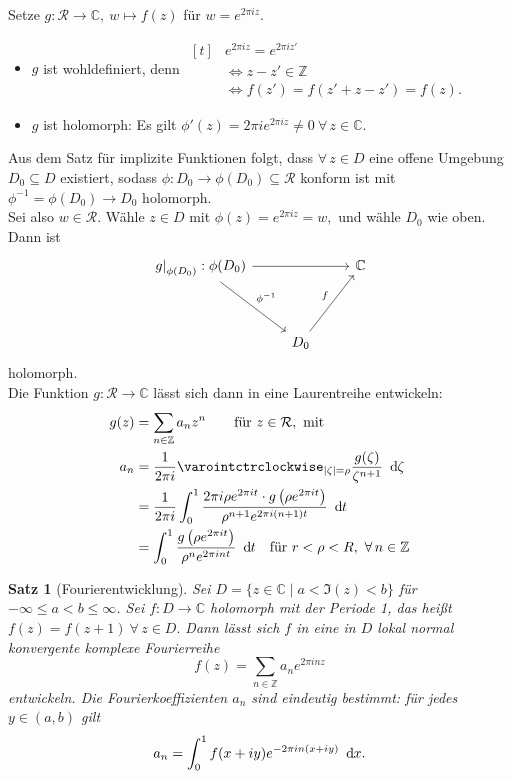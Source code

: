 \documentclass[a4paper,12pt]{book}
\theoremstyle{newthm}
\newtheorem{thm}{Satz}[section]
\theoremstyle{newdef}
\theoremstyle{newrem}
\newcommand{\Z}{\mathbb{Z}}
\newcommand{\C}{\mathbb{C}}
\renewcommand{\d}{\ \operatorname{d}\hspace{-2px}}
\newcommand{\bound}[2]{\left.#1\right|_{#2}}
\begin{document}
		Setze $ g: \mathcal{R} \to \C,\ w \mapsto f(z) $ für $ w = e^{2\pi iz} $.
		\begin{itemize}
			\item $g$ ist wohldefiniert, denn $ \begin{aligned}[t]
			&e^{2\pi iz} = e^{2\pi iz'} \\
			&\iff z - z' \in \Z \\
			&\iff f(z') = f(z' + z-z') = f(z).
			\end{aligned} $
			\item $g$ ist holomorph: Es gilt $ \phi'(z) = 2\pi i e^{2\pi iz} \neq 0\ \forall\, z \in \C. $
		\end{itemize}
		Aus dem Satz für implizite Funktionen folgt, dass $ \forall\, z \in D $ eine offene Umgebung $ D_0 \subseteq D $ existiert, sodass $ \phi: D_0 \to \phi(D_0) \subseteq \mathcal{R} $ konform ist mit $ \phi^{-1} = \phi(D_0) \to D_0 $ holomorph.\\
		Sei also $ w \in \mathcal{R}. $ Wähle $ z \in D $ mit $ \phi(z) = e^{2\pi iz} = w, $ und wähle $D_0$ wie oben. Dann ist
		$$\begin{tikzcd}
			\bound{g}{\phi(D_0)}:\phi(D_0)\arrow{rr}\arrow{ddr}{\phi^{-1}} & & \C\\
			&&\\
			&D_0 \arrow{uur}{f}
		\end{tikzcd}$$
		holomorph.\\
		Die Funktion $ g: \mathcal{R} \to \C $ lässt sich dann in eine Laurentreihe entwickeln:
		\begin{align*}
			g(z) &= \sum_{n \in \Z} a_nz^n\qquad \text{für } z \in \mathcal{R},\ \text{mit}\\
			a_n &= \frac{1}{2\pi i} \varointctrclockwise_{|\zeta| = \rho} \frac{g(\zeta)}{\zeta^{n+1}}\d\zeta\\
			&= \frac{1}{2\pi i} \int_0^1 \frac{2\pi i \rho e^{2\pi it} \cdot g\left(\rho e^{2\pi it}\right)}{\rho^{n+1} e^{2\pi i(n+1)t}} \d t\\
			&= \int_0^1 \frac{g\left( \rho e^{2\pi it} \right)}{\rho^n e^{2\pi int}} \d t \quad \text{für } r<\rho<R,\ \forall\, n \in \Z
		\end{align*}
		
		\begin{thm}[Fourierentwicklung]
			Sei $ D = \{ z \in \C \mid  a < \Im(z) < b \} $ für $ -\infty \leq a < b \leq \infty $. Sei $ f: D \to \C $ holomorph mit der Periode 1, das heißt $ f(z) = f(z+1)\ \forall \, z \in D. $ Dann lässt sich $f$ in eine in $D$ lokal normal konvergente komplexe \emph{Fourierreihe} 
			\[ f(z) = \sum_{n \in \Z} a_n e^{2\pi inz} \]
			entwickeln. Die \emph{Fourierkoeffizienten} $a_n$ sind eindeutig bestimmt: für jedes $ y \in (a,b) $ gilt
			\[ a_n = \int_0^1 f(x+iy)e^{-2\pi in(x+iy)} \d x. \]
		\end{thm}
	
\end{document}
